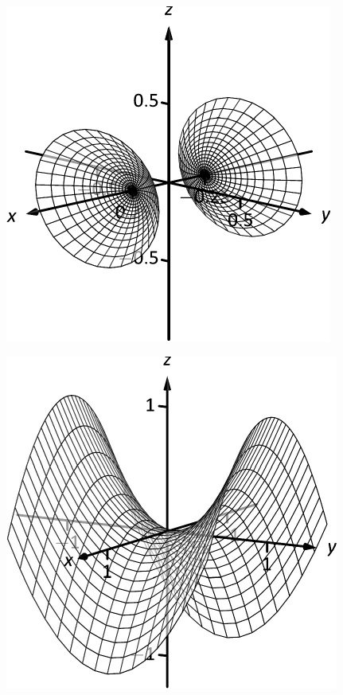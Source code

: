 \documentclass[10pt]{article}
\begin{document}
\includegraphics{fig10_01_ex_27_3DBW.pdf}
\texttt{}

\includegraphics{fig10_01_ex_28_3DBW.pdf}
\texttt{}
\end{document}
